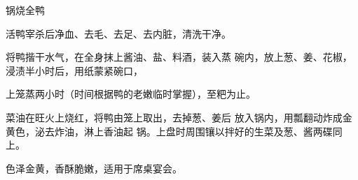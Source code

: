 \begin{recipe}{锅烧全鸭}

\ingredients


\cooking

\step 活鸭宰杀后净血、去毛、去足、去内脏，清洗干净。

\step 将鸭揩干水气，在全身抹上酱油、盐、料酒，装入蒸 碗内，放上葱、姜、花椒，浸渍半小时后，用纸蒙紧碗口，

上笼蒸两小时（时间根据鸭的老嫩临时掌握），至粑为止。

\step 菜油在旺火上烧红，将鸭由笼上取出，去掉葱、姜后 放入锅内，用瓢翻动炸成金黄色，泌去炸油，淋上香油起 锅。上盘时周围镶以拌好的生菜及葱、酱两碟同上。

\notes

色泽金黄，香酥脆嫩，适用于席桌宴会。

\end{recipe}

